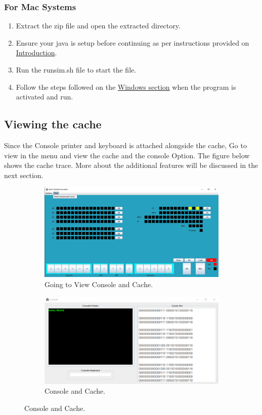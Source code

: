 \documentclass[10pt]{article}
\begin{document}
\subsubsection{For Mac Systems}
\begin{enumerate}
  \item Extract the zip file and open the extracted directory.
  \item Ensure your java is setup before continuing as per instructions 
  provided on \hyperref[macsetup]{Introduction}.
  \item Run the runsim.sh file to start the file.
  \item Follow the steps followed on the \hyperref[steps_for_windows]{Windows section} 
  when the program is activated and run.
\end{enumerate}
\subsection{Viewing the cache}
Since the Console printer and keyboard is attached alongside the cache, Go to view in the menu and 
view the cache and the console Option. The figure below shows the cache trace. More about the additional
features will be discussed in the next section.
\begin{figure}[H]
  \centering
  \begin{subfigure}[b]{0.48\textwidth}
    \includegraphics[width=\textwidth]{Pics/Fig12.png}
    \caption{Going to View Console and Cache.}
    \label{fig:ViewMenu}
  \end{subfigure}
  \hfill
  \begin{subfigure}[b]{0.48\textwidth}
    \includegraphics[width=\textwidth]{Pics/Fig13.png}
    \caption{Console and Cache.}
    \label{fig:ViewConsoleCache}
  \end{subfigure}
\end{figure}
\end{document}
